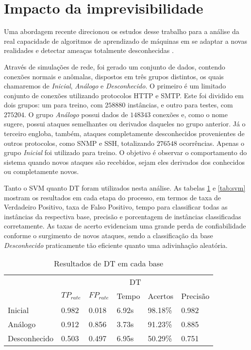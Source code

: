 \section{Impacto da imprevisibilidade}
Uma abordagem recente direcionou os estudos desse trabalho para a análise da real capacidade de algoritmos de
aprendizado de máquinas em se adaptar a novas realidades e detectar ameaças totalmente desconhecidas \cite{sommer10}.
\par Através de simulações de rede, foi gerado um conjunto de dados, contendo conexões normais e anômalas,
dispostos em três grupos distintos, os quais chamaremos de \textit{Inicial}, \textit{Análogo} e \textit{Desconhecido}.
O primeiro é um limitado conjunto de conexões utilizando protocolos HTTP e SMTP. Este foi dividido em dois grupos:
um para treino, com $258880$ instâncias, e outro para testes, com $275204$. O grupo \textit{Análogo} possui dados de
$148343$ conexões e, como o nome sugere, possui ataques semelhantes ou derivados daqueles no grupo anterior.
Já o terceiro engloba, também, ataques completamente desconhecidos provenientes de outros
protocolos, como SNMP e SSH, totalizando $276548$ ocorrências. Apenas o grupo \textit{Inicial} foi utilizado para
treino. O objetivo é observar o comportamento do sistema quando novos
ataques são recebidos, sejam eles derivados dos conhecidos ou completamente novos.
\par Tanto o SVM quanto DT foram utilizados nesta análise. As tabelas \ref{tab:dt} e \ref{tab:svm} mostram os resultados
em cada etapa do processo, em termos de taxa de Verdadeiro Positivo, taxa de Falso Positivo, tempo para classificar
todas as instâncias da respectiva base, precisão e porcentagem de instâncias classificadas corretamente. As taxas de
acerto evidenciam uma grande perda de confiabilidade conforme o surgimento de novos ataques, sendo a classificação da
base \textit{Desconhecido} praticamente tão eficiente quanto uma adivinhação aleatória.

\begin{table}[h]
    \centering
    \caption{Resultados de DT em cada base}
    \label{tab:dt}
    \begin{tabular}{l|l|l|l|l|l|}
        \cline{2-6}
                                                                   & \multicolumn{5}{c|}{\cellcolor[HTML]{EFEFEF}DT}        \\ \cline{2-6}
                                                                   & $TP_{rate}$ & $FP_{rate}$ & Tempo & Acertos & Precisão \\ \hline
        \multicolumn{1}{|l|}{\cellcolor[HTML]{EFEFEF}Inicial}      & 0.982       & 0.018       & 6.92s & 98.18\% & 0.982    \\ \hline
        \multicolumn{1}{|l|}{\cellcolor[HTML]{EFEFEF}Análogo}      & 0.912       & 0.856       & 3.73s  & 91.23\% & 0.885    \\ \hline
        \multicolumn{1}{|l|}{\cellcolor[HTML]{EFEFEF}Desconhecido} & 0.503       & 0.497       & 6.95s & 50.29\% & 0.751    \\ \hline
    \end{tabular}
\end{table}

